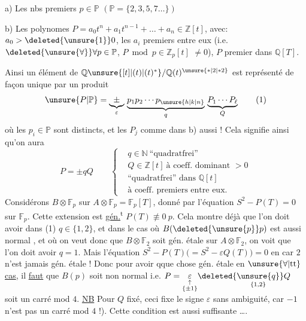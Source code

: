 a) Les nbs premiers $p\in\mathbb P$ \unsure{!} $(\mathbb P=\{2,3,5,7\ldots\})$

b) Les polynomes $P=a_0t^n+a_1t^{n-1}+\ldots+a_n\in\mathbb Z[t]$, avec: $a_0>\deleted{\unsure{1}}0$,  les $a_i$ premiers entre eux (i.e. $\deleted{\unsure{\forall}}\forall p\in\mathbb P$, $P\bmod p\in\mathbb Z_p[t]$  $\ne0$), $P$ premier dans $\mathbb Q[T]$.

Ainsi un élément de $\mathbb Q\unsure{[t]|(t)|(t)^*}/\mathbb Q(t)^{\unsure{*|2|*2}}$ est représenté de façon unique par un produit
\[
\unsure{P|\mathbb P}=\underbrace{\pm}_{\varepsilon}\,
\underbrace{p_1p_2\cdots p_{\unsure{h|k|n}}}_{q}\,
\underbrace{P_1\cdots P_\ell}_{Q}\tag*{(1)}
\]
où les $p_i\in\mathbb P$ sont distincts, et les $P_j$ comme dans b) aussi ! Cela signifie ainsi qu'on aura
\[
P=\pm qQ\qquad
\left\{\begin{aligned}
&q\in\mathbb N\ \text{``quadratfrei''}\\
&Q\in\mathbb Z[t]\ \text{à coeff. dominant }>0\\
&\text{``quadratfrei'' dans }\mathbb Q[t]\\
&\text{à coeff. premiers entre eux.}
\end{aligned}\right.
\]
Considérons   $B\otimes\mathbb F_p$ sur $A\otimes\mathbb F_p=\mathbb F_p[T]$, donné par l'équation \quad $S^2-P(T)=0$  sur $\mathbb F_p$.  Cette extension est \uline{gén.}\textsuperscript{t}   $P(T)\not\equiv0\ p$. Cela montre déjà que  l'on doit avoir dans (1) $q\in\{1,2\}$, et dans le cas où $B(\deleted{\unsure{p}}p)$ est aussi normal , et où on veut donc que $B\otimes\mathbb F_2$ soit gén. étale sur $A\otimes\mathbb F_2$, on voit que l'on doit avoir $q=1$. Mais l'équation $S^2-P(T)\bigl(=S^2-\varepsilon Q(T)\bigr)=0$ en car $2$ n'est jamais gén. étale ! Donc  pour avoir qque chose gén. étale en \uline{$\unsure{\forall|\mathrm{tt}}$ cas}, il \uline{faut} que $B(p)$ soit non normal i.e.  $P=\underset{\substack{\uparrow\\\{\pm1\}}}{\varepsilon}\deleted{\underset{\{1,2\}}{\unsure{q}}}Q$ soit un carré mod $4$. \uline{NB} Pour $Q$ fixé, ceci fixe le signe $\varepsilon$ sans ambiguité, car $-1$ n'est pas un carré mod $4$ !). Cette condition est aussi suffisante \ldots.


